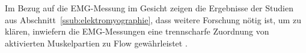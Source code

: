 Im Bezug auf die \ac{EMG}-Messung im Gesicht zeigen die Ergebnisse der Studien aus Abschnitt~\ref{ssub:elektromyographie}, dass weitere Forschung nötig ist, um zu klären, inwiefern die \ac{EMG}-Messungen eine trennscharfe Zuordnung von aktivierten Muskelpartien zu Flow gewährleistet \citep{Peifer2012}.

